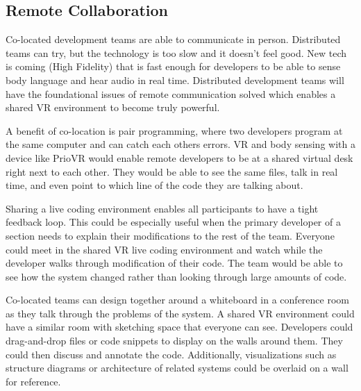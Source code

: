 \documentclass{acm_proc_article-sp}
\begin{document}
\subsection{Remote Collaboration}


Co-located development teams are able to communicate in person. Distributed teams can try, but the technology is too slow and it doesn't feel good. New tech is coming (High Fidelity) that is fast enough for developers to be able to sense body language and hear audio in real time.  Distributed development teams will have the foundational issues of remote communication solved which enables a shared VR environment to become truly powerful.

A benefit of co-location is pair programming, where two developers program at the same computer and can catch each others errors. VR and body sensing with a device like PrioVR would enable remote developers to be at a shared virtual desk right next to each other. They would be able to see the same files, talk in real time, and even point to which line of the code they are talking about. 

Sharing a live coding environment enables all participants to have a tight feedback loop. This could be especially useful when the primary developer of a section needs to explain their modifications to the rest of the team. Everyone could meet in the shared VR live coding environment and watch while the developer walks through modification of their code. The team would be able to see how the system changed rather than looking through large amounts of code.

Co-located teams can design together around a whiteboard in a conference room as they talk through the problems of the system. A shared VR environment could have a similar room with sketching space that everyone can see. Developers could drag-and-drop files or code snippets to display on the walls around them. They could then discuss and annotate the code. Additionally, visualizations such as structure diagrams or architecture of related systems could be overlaid on a wall for reference.
\end{document}
